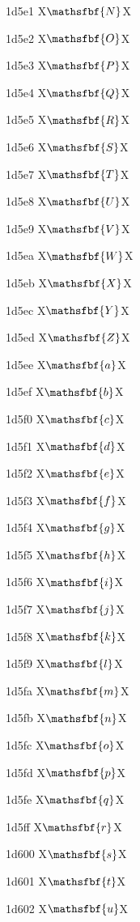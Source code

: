 \documentclass[11pt]{article}
\begin{document}
1d5e1 X{\ensuremath{\mathsfbf{N}}}X

1d5e2 X{\ensuremath{\mathsfbf{O}}}X

1d5e3 X{\ensuremath{\mathsfbf{P}}}X

1d5e4 X{\ensuremath{\mathsfbf{Q}}}X

1d5e5 X{\ensuremath{\mathsfbf{R}}}X

1d5e6 X{\ensuremath{\mathsfbf{S}}}X

1d5e7 X{\ensuremath{\mathsfbf{T}}}X

1d5e8 X{\ensuremath{\mathsfbf{U}}}X

1d5e9 X{\ensuremath{\mathsfbf{V}}}X

1d5ea X{\ensuremath{\mathsfbf{W}}}X

1d5eb X{\ensuremath{\mathsfbf{X}}}X

1d5ec X{\ensuremath{\mathsfbf{Y}}}X

1d5ed X{\ensuremath{\mathsfbf{Z}}}X

1d5ee X{\ensuremath{\mathsfbf{a}}}X

1d5ef X{\ensuremath{\mathsfbf{b}}}X

1d5f0 X{\ensuremath{\mathsfbf{c}}}X

1d5f1 X{\ensuremath{\mathsfbf{d}}}X

1d5f2 X{\ensuremath{\mathsfbf{e}}}X

1d5f3 X{\ensuremath{\mathsfbf{f}}}X

1d5f4 X{\ensuremath{\mathsfbf{g}}}X

1d5f5 X{\ensuremath{\mathsfbf{h}}}X

1d5f6 X{\ensuremath{\mathsfbf{i}}}X

1d5f7 X{\ensuremath{\mathsfbf{j}}}X

1d5f8 X{\ensuremath{\mathsfbf{k}}}X

1d5f9 X{\ensuremath{\mathsfbf{l}}}X

1d5fa X{\ensuremath{\mathsfbf{m}}}X

1d5fb X{\ensuremath{\mathsfbf{n}}}X

1d5fc X{\ensuremath{\mathsfbf{o}}}X

1d5fd X{\ensuremath{\mathsfbf{p}}}X

1d5fe X{\ensuremath{\mathsfbf{q}}}X

1d5ff X{\ensuremath{\mathsfbf{r}}}X

1d600 X{\ensuremath{\mathsfbf{s}}}X

1d601 X{\ensuremath{\mathsfbf{t}}}X

1d602 X{\ensuremath{\mathsfbf{u}}}X
\end{document}
